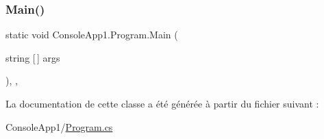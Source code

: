 \mbox{\label{class_console_app1_1_1_program_ae6cedb55c6b52f4193827df8c1cf88cc}} 
\subsubsection{\texorpdfstring{Main()}{Main()}}
{\footnotesize\ttfamily static void Console\+App1.\+Program.\+Main (\begin{DoxyParamCaption}\item[{string \mbox{[}$\,$\mbox{]}}]{args }\end{DoxyParamCaption})\hspace{0.3cm}{\ttfamily [inline]}, {\ttfamily [static]}, {\ttfamily [private]}}



La documentation de cette classe a été générée à partir du fichier suivant \+:\begin{DoxyCompactItemize}
\item 
Console\+App1/\mbox{\hyperlink{_console_app1_2_program_8cs}{Program.\+cs}}\end{DoxyCompactItemize}
